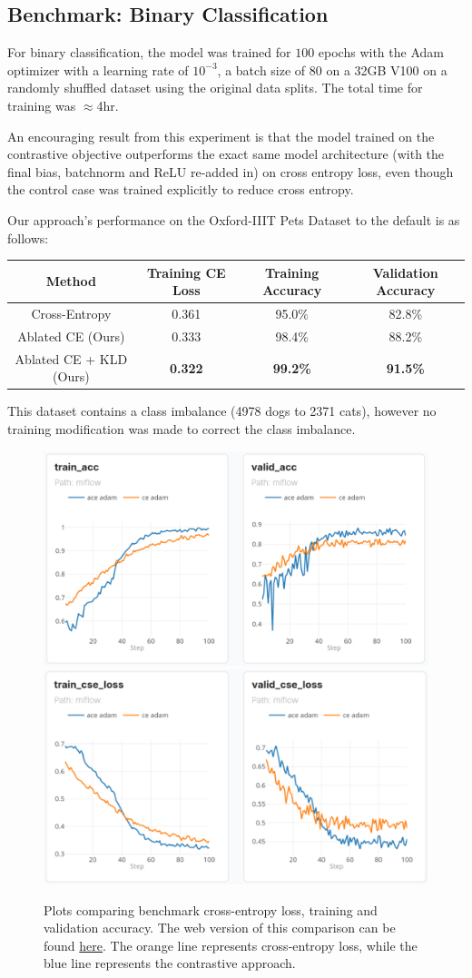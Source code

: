 \documentclass{article}
\theoremstyle{plain}
\theoremstyle{definition}
\theoremstyle{remark}
\begin{document}
\subsection{Benchmark: Binary Classification}

For binary classification, the model was trained for $100$ epochs with the Adam optimizer with a learning rate of $10^{-3}$, a batch size of $80$ on a 32GB V100 on a randomly shuffled dataset using the original data splits. The total time for training was $\approx$4hr.

An encouraging result from this experiment is that the model trained on the contrastive objective outperforms the exact same model architecture (with the final bias, batchnorm and ReLU re-added in) on cross entropy loss, even though the control case was trained explicitly to reduce cross entropy.

Our approach's performance on the Oxford-IIIT Pets Dataset to the default is as follows:

\begin{table}[h]
	\centering
	\begin{tabular}{c|ccc}
		\toprule
		\textbf{Method}  & \textbf{Training CE Loss}  & \textbf{Training Accuracy}   & \textbf{Validation Accuracy} \\
		\midrule
		Cross-Entropy & 0.361 & 95.0\% & 82.8\% \\
		Ablated CE (Ours) & 0.333 & 98.4\% & 88.2\% \\
		Ablated CE + KLD (Ours) & \bf 0.322 & \bf 99.2\% & \bf 91.5\% \\
		\bottomrule
	\end{tabular}
\end{table}

This dataset contains a class imbalance (4978 dogs to 2371 cats), however no training modification was made to correct the class imbalance.

\begin{figure}[H]
	\centering
	\includegraphics[width=.4\textwidth]{img/accuracy.png}
	\hspace{4em}
	\includegraphics[width=.4\textwidth]{img/loss.png}
	\caption{Plots comparing benchmark cross-entropy loss, training and validation accuracy. The web version of this comparison can be found \href{https://dagshub.com/jinensetpal/contrastive-optimization/experiments\#/compare?experiments=[\%22m_cea5cf4fcbbb4c3f984b2396927cf80c\%22,\%22m_101287828f604122a092a2501ec3facb\%22]}{here}. The orange line represents cross-entropy loss, while the blue line represents the contrastive approach.}
\end{figure}
\end{document}
